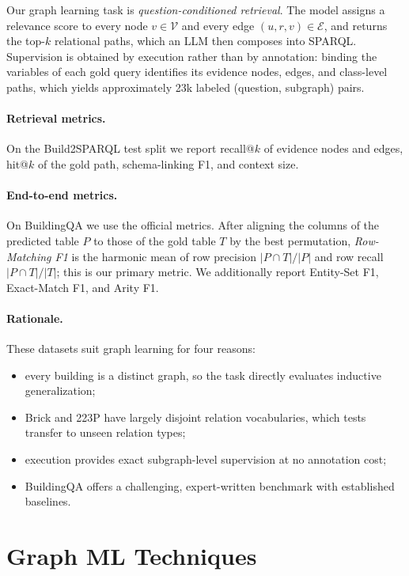 \documentclass[11pt]{article}
\begin{document}
Our graph learning task is \emph{question-conditioned retrieval}. The model assigns a relevance score to every node $v\in\mathcal{V}$ and every edge $(u,r,v)\in\mathcal{E}$, and returns the top-$k$ relational paths, which an LLM then composes into SPARQL. Supervision is obtained by execution rather than by annotation: binding the variables of each gold query identifies its evidence nodes, edges, and class-level paths, which yields approximately 23k labeled (question, subgraph) pairs.

\paragraph{Retrieval metrics.} On the Build2SPARQL test split we report recall@$k$ of evidence nodes and edges, hit@$k$ of the gold path, schema-linking F1, and context size.

\paragraph{End-to-end metrics.} On BuildingQA we use the official metrics. After aligning the columns of the predicted table $P$ to those of the gold table $T$ by the best permutation, \emph{Row-Matching F1} is the harmonic mean of row precision $|P\cap T|/|P|$ and row recall $|P\cap T|/|T|$; this is our primary metric. We additionally report Entity-Set F1, Exact-Match F1, and Arity F1.

\paragraph{Rationale.} These datasets suit graph learning for four reasons:
\begin{itemize}
  \item every building is a distinct graph, so the task directly evaluates inductive generalization;
  \item Brick and 223P have largely disjoint relation vocabularies, which tests transfer to unseen relation types;
  \item execution provides exact subgraph-level supervision at no annotation cost;
  \item BuildingQA offers a challenging, expert-written benchmark with established baselines.
\end{itemize}

\section{Graph ML Techniques}
\end{document}
